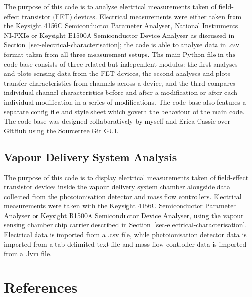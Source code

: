 \documentclass[
  a4paper,
]{scrbook}
\begin{document}
The purpose of this code is to analyse electrical measurements taken of
field-effect transistor (FET) devices. Electrical measurements were
either taken from the Keysight 4156C Semiconductor Parameter Analyser,
National Instruments NI-PXIe or Keysight B1500A Semiconductor Device
Analyser as discussed in Section~\ref{sec-electrical-characterisation};
the code is able to analyse data in .csv format taken from all three
measurement setups. The main Python file in the code base consists of
three related but independent modules: the first analyses and plots
sensing data from the FET devices, the second analyses and plots
transfer characteristics from channels across a device, and the third
compares individual channel characteristics before and after a
modification or after each individual modification in a series of
modifications. The code base also features a separate config file and
style sheet which govern the behaviour of the main code. The code base
was designed collaboratively by myself and Erica Cassie over GitHub
using the Sourcetree Git GUI.

\hypertarget{sec-vapour-delivery-analysis}{%
\section{Vapour Delivery System
Analysis}\label{sec-vapour-delivery-analysis}}

The purpose of this code is to display electrical measurements taken of
field-effect transistor devices inside the vapour delivery system
chamber alongside data collected from the photoionisation detector and
mass flow controllers. Electrical measurements were taken with the
Keysight 4156C Semiconductor Parameter Analyser or Keysight B1500A
Semiconductor Device Analyser, using the vapour sensing chamber chip
carrier described in Section~\ref{sec-electrical-characterisation}.
Electrical data is imported from a .csv file, while photoionisation
detector data is imported from a tab-delimited text file and mass flow
controller data is imported from a .lvm file.

\hypertarget{references}{%
\chapter*{References}\label{references}}


\begingroup
\raggedright

\printbibliography[heading=none]

\endgroup

\newpage{}

\hfill\break

\thispagestyle{empty}

\mbox{~} \clearpage \newpage


\backmatter
\end{document}
